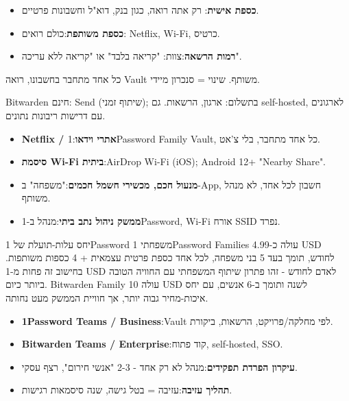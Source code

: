 \begin{itemize}
  \item \textbf{כספת אישית}: רק אתה רואה, כגון בנק, דוא"ל וחשבונות פרטיים.
  \item \textbf{כספת משותפת}:כולם רואים: Netflix, Wi-Fi, כרטיס.
  \item \textbf{רמות הרשאה}:צוות: "קריאה בלבד" או "קריאה ללא עריכה".
\end{itemize}

כל אחד מתחבר בחשבונו, רואה Vault משותף. שינוי = סנכרון מיידי.


Bitwarden חינם: Send (שיתוף זמני); בתשלום: ארגון, הרשאות. גם self-hosted, לארגונים עם דרישות ריבונות נתונים.


\begin{itemize}
  \item \textbf{Netflix / אתרי וידאו}:1Password Family Vault, כל אחד מתחבר, בלי צ'אט.
  \item \textbf{סיסמת Wi-Fi ביתית}:AirDrop Wi-Fi (iOS); Android 12+ "Nearby Share".
  \item \textbf{מנעול חכם, מכשירי חשמל חכמים}:"משפחה" ב-App, חשבון לכל אחד, לא מנהל משותף.
  \item \textbf{ממשק ניהול נתב ביתי}:מנהל ב-1Password, Wi-Fi אורח SSID נפרד.
\end{itemize}

\begin{tcbinfo}{יחס עלות-תועלת של 1Password משפחתי}
1Password Families עולה כ-4.99 USD לחודש, תומך בעד 5 בני משפחה, לכל אחד כספת פרטית עצמאית + 4 כספות משותפות. בחישוב זה פחות מ-1 USD לאדם לחודש - זהו פתרון שיתוף המשפחתי עם החוויה הטובה ביותר כיום. Bitwarden Family עולה 10 USD לשנה ותומך ב-6 אנשים, עם יחס איכות-מחיר גבוה יותר, אך חוויית הממשק מעט נחותה.

\end{tcbinfo}


\begin{itemize}
  \item \textbf{1Password Teams / Business}:Vault לפי מחלקה/פרויקט, הרשאות, ביקורת.
  \item \textbf{Bitwarden Teams / Enterprise}:קוד פתוח, self-hosted, SSO.
  \item \textbf{עיקרון הפרדת תפקידים}:מנהל לא רק אחד - 2-3 "אנשי חירום", רצף עסקי.
  \item \textbf{תהליך עזיבה}:עזיבה = בטל גישה, שנה סיסמאות רגישות.
\end{itemize}

